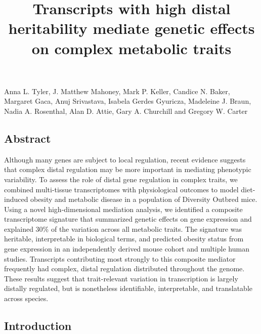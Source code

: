 \documentclass[
]{article}
\title{Transcripts with high distal heritability mediate genetic effects
on complex metabolic traits}
\author{}
\date{\vspace{-2.5em}}
\begin{document}
\maketitle

Anna L. Tyler, J. Matthew Mahoney, Mark P. Keller, Candice N. Baker,
Margaret Gaca, Anuj Srivastava, Isabela Gerdes Gyuricza, Madeleine J.
Braun, Nadia A. Rosenthal, Alan D. Attie, Gary A. Churchill and Gregory
W. Carter

\subsection{Abstract}\label{abstract}

Although many genes are subject to local regulation, recent evidence
suggests that complex distal regulation may be more important in
mediating phenotypic variability. To assess the role of distal gene
regulation in complex traits, we combined multi-tissue transcriptomes
with physiological outcomes to model diet-induced obesity and metabolic
disease in a population of Diversity Outbred mice. Using a novel
high-dimensional mediation analysis, we identified a composite
transcriptome signature that summarized genetic effects on gene
expression and explained 30\% of the variation across all metabolic
traits. The signature was heritable, interpretable in biological terms,
and predicted obesity status from gene expression in an independently
derived mouse cohort and multiple human studies. Transcripts
contributing most strongly to this composite mediator frequently had
complex, distal regulation distributed throughout the genome. These
results suggest that trait-relevant variation in transcription is
largely distally regulated, but is nonetheless identifiable,
interpretable, and translatable across species.

\subsection{Introduction}\label{introduction}
\end{document}
